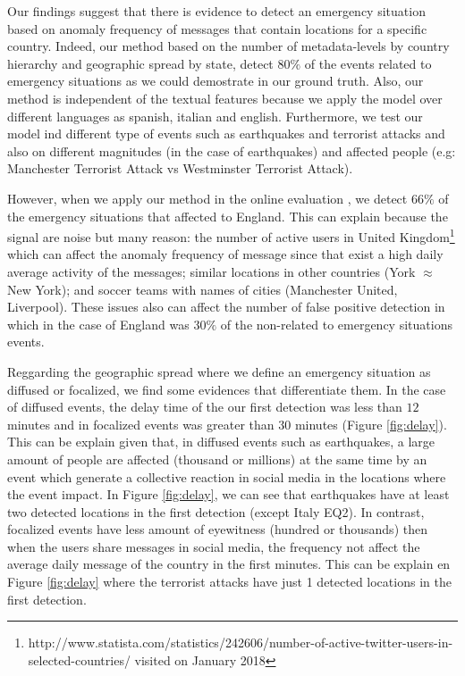 \documentclass[sigconf]{acmart}
\begin{document}
Our findings suggest that there is evidence to detect an emergency situation based on anomaly frequency of messages that contain locations for a specific country. Indeed, our method based on the number of metadata-levels by country hierarchy and geographic spread by state, detect $80\%$ of the events related to emergency situations as we could demostrate in our ground truth. Also, our method is independent of the textual features because we apply the model over different languages as spanish, italian and english. Furthermore, we test our model ind different type of events such as earthquakes and terrorist attacks
and also on different magnitudes (in the case of earthquakes) and affected people (e.g: Manchester Terrorist Attack vs Westminster Terrorist Attack).

However, when we apply our method in the online evaluation , we detect $66\%$ of the emergency situations that affected to England. This can explain because the signal are noise but many reason: the number of active users in United Kingdom\footnote{http://www.statista.com/statistics/242606/number-of-active-twitter-users-in-selected-countries/ visited on January 2018} which can affect the anomaly frequency of message since that exist a high daily average activity of the messages; similar locations in other countries (York $\approx$ New York); and soccer teams with names of cities (Manchester United, Liverpool). These issues also can affect the number of false positive detection in which in the case of England was $30\%$ of the non-related to emergency situations events.

Reggarding the geographic spread where we define an emergency situation as diffused or focalized, we find some evidences that differentiate them. In the case of diffused events, the delay time of the our first detection was less than $12$ minutes and in focalized events was greater than $30$ minutes (Figure \ref{fig:delay}). This can be explain given that, in diffused events such as earthquakes, a large amount of people are affected (thousand or millions) at the same time by an event which generate a collective reaction in social media in the locations where the event impact. In Figure \ref{fig:delay}, we can see that earthquakes have at least two detected locations in the first detection (except Italy EQ2). In contrast, focalized events have less amount of eyewitness (hundred or thousands) then when the users share messages in social media, the frequency not affect the average daily message of the country in the first minutes. This can be explain en Figure \ref{fig:delay} where the terrorist attacks have just 1 detected locations in the first detection.
\end{document}
